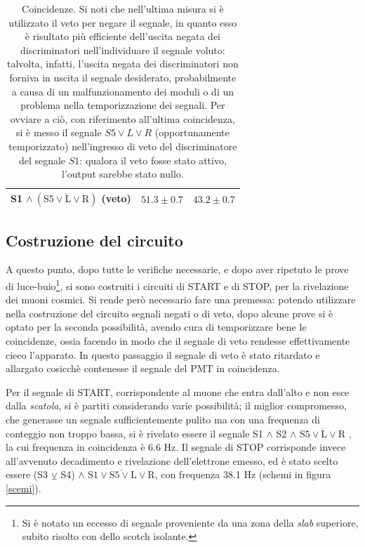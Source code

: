 \documentclass[10pt, oneside, a4paper]{article}   	%
\begin{document}
\begin{table}[H]
\begin{tabular}{ccc}
		S1 $\wedge \ (\overline{\mbox{S5}\vee \mbox{L} \vee \mbox{R}})$ (veto)	& $51.3 \pm 0.7$	& $43.2 \pm 0.7$	\\
		\bottomrule
	\end{tabular}
	\caption{Coincidenze. 
	Si noti che nell'ultima misura si è utilizzato il veto per negare il segnale, 
	in quanto esso è risultato più efficiente dell'uscita negata dei discriminatori 
	nell'individuare il segnale voluto: talvolta, infatti, l'uscita negata dei discriminatori non forniva in uscita il segnale desiderato, 
	probabilmente a causa di un malfunzionamento dei moduli o di un problema nella temporizzazione dei segnali. Per ovviare a ciò, con riferimento all'ultima coincidenza,
	si è messo il segnale $S5\vee L\vee R$ (opportunamente temporizzato)
	nell'ingresso di veto del discriminatore del 
	segnale $S1$: qualora il veto fosse stato attivo, l'output 
	sarebbe stato nullo.}
	\label{coincidenze}
\end{table}
%
\subsection{Costruzione del circuito}
A questo punto, dopo tutte le verifiche necessarie, e dopo aver ripetuto le prove di luce-buio\footnote{Si è notato un eccesso di segnale proveniente da una zona della \emph{slab} superiore, subito risolto con dello scotch isolante.}, si sono costruiti i circuiti di START e di STOP, per la rivelazione dei muoni cosmici. Si rende però necessario fare una premessa: potendo utilizzare nella costruzione del circuito segnali negati o di veto, dopo alcune prove si è optato per la seconda possibilità, avendo cura di temporizzare bene le coincidenze, ossia facendo in modo che il segnale di veto rendesse effettivamente cieco l'apparato. In questo passaggio il segnale di veto è stato ritardato e allargato cosicchè contenesse il segnale del PMT in coincidenza.

Per il segnale di START, corrispondente al muone che entra dall'alto e non esce dalla \emph{scatola}, si è partiti considerando varie possibilità; il miglior compromesso, che generasse un segnale sufficientemente pulito ma con una frequenza di conteggio non troppo bassa, si è rivelato essere il segnale S1 $\wedge$ S2  $\wedge$ $\overline{\mbox{S5}\vee \mbox{L} \vee \mbox{R}}$ , la cui frequenza in coincidenza è 6.6 Hz.
Il segnale di STOP corrisponde invece all'avvenuto decadimento e rivelazione dell'elettrone emesso, ed è stato scelto essere (S3 $\veebar$ S4)  $\wedge$ $\overline{\mbox{S1} \vee \mbox{S5}\vee \mbox{L} \vee \mbox{R}}$, con frequenza 38.1 Hz (schemi in figura \ref{scemi}).
\end{document}
